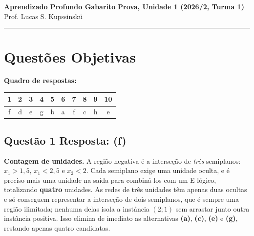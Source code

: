 \documentclass[11pt,a4paper]{article}
\begin{document}
{\Large\bfseries Aprendizado Profundo \textemdash{} Gabarito} \hfill \textbf{Prova, Unidade 1 (2026/2, Turma 1)}\\
Prof. Lucas S. Kupssinskü

\rule{\linewidth}{0.8pt}

\section*{Questões Objetivas}

\textbf{Quadro de respostas:}
\begin{center}
\begin{tabular}{|c|c|c|c|c|c|c|c|c|c|}
\hline
1 & 2 & 3 & 4 & 5 & 6 & 7 & 8 & 9 & 10 \\\hline
f & d & e & g & b & a & f & c & h & e \\\hline
\end{tabular}
\end{center}

\color{blue}

\subsection*{Questão 1 \textemdash{} Resposta: (f)}
\textbf{Contagem de unidades.} A região negativa é a interseção de \emph{três} semiplanos: $x_1 > 1{,}5$, $x_1 < 2{,}5$ e $x_2 < 2$. Cada semiplano exige uma unidade oculta, e é preciso mais uma unidade na saída para combiná-los com um E lógico, totalizando \textbf{quatro} unidades. As redes de três unidades têm apenas duas ocultas e só conseguem representar a interseção de dois semiplanos, que é sempre uma região ilimitada; nenhuma delas isola a instância $(2;1)$ sem arrastar junto outra instância positiva. Isso elimina de imediato as alternativas \textbf{(a)}, \textbf{(c)}, \textbf{(e)} e \textbf{(g)}, restando apenas quatro candidatas.
\end{document}
